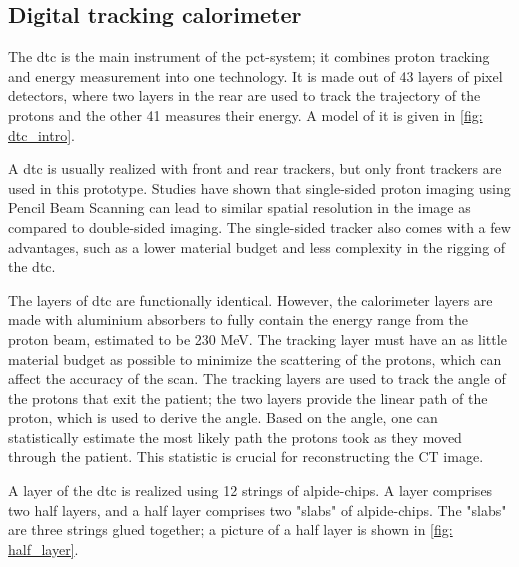 \documentclass[main.tex]{subfiles}
\begin{document}
\subsection{Digital tracking calorimeter}

The \gls{dtc} is the main instrument of the \gls{pct}-system; it combines proton tracking and energy measurement into one technology. It is made out of 43 layers of pixel detectors, where two layers in the rear are used to track the trajectory of the protons and the other 41 measures their energy. A model of it is given in \autoref{fig: dtc_intro}.

A \gls{dtc} is usually realized with front and rear trackers, but only front trackers are used in this prototype. Studies have shown that single-sided proton imaging using Pencil Beam Scanning can lead to similar spatial resolution in the image as compared to double-sided\cite{pbs_result} imaging. The single-sided tracker also comes with a few advantages, such as a lower material budget and less complexity in the rigging of the \gls{dtc}.

The layers of \gls{dtc} are functionally identical. However, the calorimeter layers are made with aluminium absorbers to fully contain the energy range from the proton beam, estimated to be 230 MeV. The tracking layer must have an as little material budget as possible to minimize the scattering of the protons, which can affect the accuracy of the scan. The tracking layers are used to track the angle of the protons that exit the patient; the two layers provide the linear path of the proton, which is used to derive the angle. Based on the angle, one can statistically estimate the most likely path the protons took as they moved through the patient. This statistic is crucial for reconstructing the CT image.

A layer of the \gls{dtc} is realized using 12 strings of \gls{alpide}-chips. A layer comprises two half layers, and a half layer comprises two "slabs" of \gls{alpide}-chips. The "slabs" are three strings glued together; a picture of a half layer is shown in \autoref{fig: half_layer}.
\end{document}
